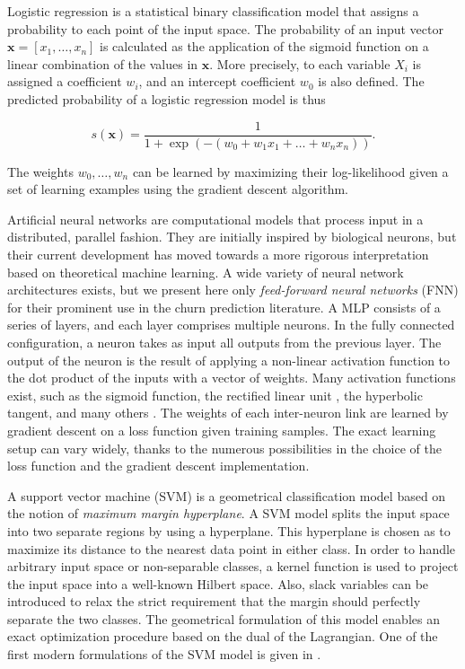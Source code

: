 Logistic regression is a statistical binary classification model that assigns a
probability to each point of the input space. The probability of an input vector
$\bm x = [x_1,\dots,x_n]$ is calculated as the application of the sigmoid function on a linear
combination of the values in $\bm x$. More precisely, to each variable $X_i$ is
assigned a coefficient $w_i$, and an intercept coefficient $w_0$ is also
defined. The predicted probability of a logistic regression model is thus

\begin{equation*}
    s(\bm x) = \frac{1}{1+\exp{(-(w_0 + w_1x_1 + \dots + w_nx_n))}}.
\end{equation*}

The weights $w_0,\dots,w_n$ can be learned by maximizing their log-likelihood
given a set of learning examples using the gradient descent algorithm.

Artificial neural networks are computational models that process input in a
distributed, parallel fashion. They are initially inspired by biological
neurons, but their current development has moved towards a more rigorous
interpretation based on theoretical machine learning. A wide variety of neural
network architectures exists, but we present here only \emph{feed-forward neural
networks} (FNN) for their prominent use in the churn prediction literature. A
MLP consists of a series of layers, and each layer comprises multiple neurons.
In the fully connected configuration, a neuron takes as input all outputs from
the previous layer. The output of the neuron is the result of applying a
non-linear activation function to the dot product of the inputs with a vector of
weights. Many  activation functions exist, such as the sigmoid function, the
rectified linear unit \parencite{nair2010rectified}, the hyperbolic tangent, and
many others \parencite{cheng1994neural}. The weights of each inter-neuron link
are learned by gradient descent on a loss function given training samples. The
exact learning setup can vary widely, thanks to the numerous possibilities in
the choice of the loss function and the gradient descent implementation.

A support vector machine (SVM) is a geometrical classification model based on
the notion of \emph{maximum margin hyperplane}. A SVM model splits the input
space into two separate regions by using a hyperplane. This hyperplane is chosen
as to maximize its distance to the nearest data point in either class. In
order to handle arbitrary input space or non-separable classes, a kernel
function is used to project the input space into a well-known Hilbert space.
Also, slack variables can be introduced to relax the strict requirement that the
margin should perfectly separate the two classes. The geometrical formulation of
this model enables an exact optimization procedure based on the dual of the
Lagrangian. One of the first modern formulations of the SVM model is given in
\parencite{boser1992training}.

